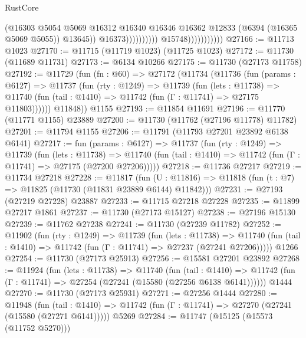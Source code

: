 \begin{lexlean}{RustCore}
\begin{coremodule}
                                                (@16303
                                                  @5054
                                                  @5069
                                                  @16312
                                                  @16340
                                                  @16346
                                                  @16362
                                                  @12833
                                                  (@6394 (@16365 @5069 @5055))
                                                  @13645))
                                              @16373))))))))))
                          @15748)))))))))))
@27166 := @11713 @1023
@27170 := @11715 (@11719 @1023) (@11725 @1023)
@27172 := @11730 (@11689 @11731)
@27173 := @6134 @10266
@27175 := @11730 (@27173 @11758)
@27192 := @11729
    (fun (fn : @60) =>
    @27172
      (@11734
        (@11736
          (fun (params : @6127) =>
          @11737
            (fun (rty : @1249) =>
            @11739
              (fun (lets : @11738) =>
              @11740 (fun (tail : @1410) => @11742 (fun (Γ : @11741) => @27175 @11803))))))
        @11848))
    @1155
@27193 := @11854 @11691
@27196 := @11770 (@11771 @1155) @23889
@27200 := @11730 (@11762 (@27196 @11778) @11782)
@27201 := @11794 @1155
@27206 := @11791 (@11793 @27201 @23892 @6138 @6141)
@27217 := fun (params : @6127) =>
  @11737
    (fun (rty : @1249) =>
    @11739
      (fun (lets : @11738) =>
      @11740 (fun (tail : @1410) => @11742 (fun (Γ : @11741) => @27175 (@27200 @27206)))))
@27218 := @11736 @27217
@27219 := @11734 @27218
@27228 := @11817
    (fun (U : @11816) => @11818 (fun (t : @7) => @11825 (@11730 (@11831 @23889 @6144) @11842)))
@27231 := @27193 (@27219 @27228) @23887
@27233 := @11715 @27218 @27228
@27235 := @11899 @27217 @1861
@27237 := @11730 (@27173 @15127)
@27238 := @27196 @15130
@27239 := @11762 @27238
@27241 := @11730 (@27239 @11782)
@27252 := @11902
    (fun (rty : @1249) =>
    @11739
      (fun (lets : @11738) =>
      @11740 (fun (tail : @1410) => @11742 (fun (Γ : @11741) => @27237 (@27241 @27206)))))
    @1266
@27254 := @11730 (@27173 @25913)
@27256 := @15581 @27201 @23892
@27268 := @11924
    (fun (lets : @11738) =>
    @11740
      (fun (tail : @1410) =>
      @11742 (fun (Γ : @11741) => @27254 (@27241 (@15580 (@27256 @6138 @6141))))))
    @1444
@27270 := @11730 (@27173 @25931)
@27271 := @27256 @1444
@27280 := @11948
    (fun (tail : @1410) => @11742 (fun (Γ : @11741) => @27270 (@27241 (@15580 (@27271 @6141)))))
    @5269
@27284 := @11747 (@15125 (@15573 (@11752 @5270)))

\end{coremodule}
\end{lexlean}
